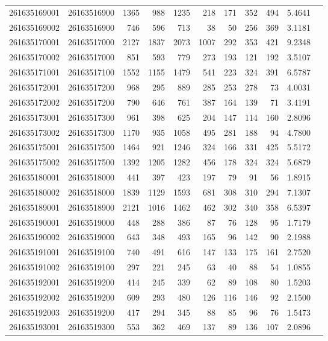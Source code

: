 \documentclass[11pt,landscape]{article}
\begin{document}
{\begin{longtable}[]{@{}lrrrrrrrrrr@{}}
261635169001 & 26163516900 & 1365 & 988 & 1235 & 218 & 171 & 352 & 494 & 5.4641 \\
261635169002 & 26163516900 & 746 & 596 & 713 & 38 & 50 & 256 & 369 & 3.1181 \\
261635170001 & 26163517000 & 2127 & 1837 & 2073 & 1007 & 292 & 353 & 421 & 9.2348 \\
261635170002 & 26163517000 & 851 & 593 & 779 & 273 & 193 & 121 & 192 & 3.5107 \\
261635171001 & 26163517100 & 1552 & 1155 & 1479 & 541 & 223 & 324 & 391 & 6.5787 \\
261635172001 & 26163517200 & 968 & 295 & 889 & 285 & 253 & 278 & 73 & 4.0031 \\
261635172002 & 26163517200 & 790 & 646 & 761 & 387 & 164 & 139 & 71 & 3.4191 \\
261635173001 & 26163517300 & 961 & 398 & 625 & 204 & 147 & 114 & 160 & 2.8096 \\
261635173002 & 26163517300 & 1170 & 935 & 1058 & 495 & 281 & 188 & 94 & 4.7800 \\
261635175001 & 26163517500 & 1464 & 921 & 1246 & 324 & 166 & 331 & 425 & 5.5172 \\
261635175002 & 26163517500 & 1392 & 1205 & 1282 & 456 & 178 & 324 & 324 & 5.6879 \\
261635180001 & 26163518000 & 441 & 397 & 423 & 197 & 79 & 91 & 56 & 1.8915 \\
261635180002 & 26163518000 & 1839 & 1129 & 1593 & 681 & 308 & 310 & 294 & 7.1307 \\
261635189001 & 26163518900 & 2121 & 1016 & 1462 & 462 & 302 & 340 & 358 & 6.5397 \\
261635190001 & 26163519000 & 448 & 288 & 386 & 87 & 76 & 128 & 95 & 1.7179 \\
261635190002 & 26163519000 & 643 & 348 & 493 & 165 & 96 & 142 & 90 & 2.1988 \\
261635191001 & 26163519100 & 740 & 491 & 616 & 147 & 133 & 175 & 161 & 2.7520 \\
261635191002 & 26163519100 & 297 & 221 & 245 & 63 & 40 & 88 & 54 & 1.0855 \\
261635192001 & 26163519200 & 414 & 245 & 339 & 62 & 89 & 108 & 80 & 1.5203 \\
261635192002 & 26163519200 & 609 & 293 & 480 & 126 & 116 & 146 & 92 & 2.1500 \\
261635192003 & 26163519200 & 417 & 294 & 345 & 88 & 85 & 96 & 76 & 1.5473 \\
261635193001 & 26163519300 & 553 & 362 & 469 & 137 & 89 & 136 & 107 & 2.0896 \\

\end{longtable}}
\end{document}

